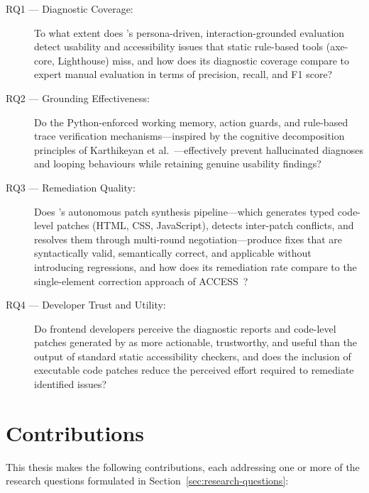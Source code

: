 \begin{description}
  \item[RQ1 --- Diagnostic Coverage:] To what extent does \versimux{}'s persona-driven, interaction-grounded evaluation detect usability and accessibility issues that static rule-based tools (axe-core, Lighthouse) miss, and how does its diagnostic coverage compare to expert manual evaluation in terms of precision, recall, and F1 score?

  \item[RQ2 --- Grounding Effectiveness:] Do the Python-enforced working memory, action guards, and rule-based trace verification mechanisms---inspired by the cognitive decomposition principles of Karthikeyan et al.~\cite{agenticpersona}---effectively prevent hallucinated diagnoses and looping behaviours while retaining genuine usability findings?

  \item[RQ3 --- Remediation Quality:] Does \versimux{}'s autonomous patch synthesis pipeline---which generates typed code-level patches (HTML, CSS, JavaScript), detects inter-patch conflicts, and resolves them through multi-round  negotiation---produce fixes that are syntactically valid, semantically correct, and applicable without introducing regressions, and how does its remediation rate compare to the single-element correction approach of ACCESS~\cite{access}?

  \item[RQ4 --- Developer Trust and Utility:] Do frontend developers perceive the diagnostic reports and code-level patches generated by \versimux{} as more actionable, trustworthy, and useful than the output of standard static accessibility checkers, and does the inclusion of executable code patches reduce the perceived effort required to remediate identified issues?
\end{description}


\section{Contributions}
\label{sec:contributions}

This thesis makes the following contributions, each addressing one or more of the research questions formulated in Section~\ref{sec:research-questions}:

